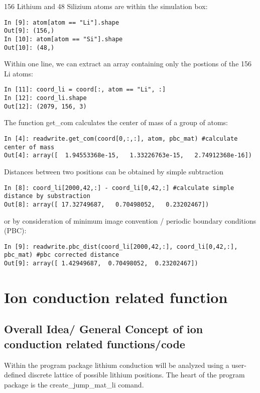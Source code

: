 \documentclass{article}
\begin{document}
\begin{itemize}
156 Lithium and 48 Silizium atoms are within the simulation box:
\begin{verbatim}
In [9]: atom[atom == "Li"].shape
Out[9]: (156,)
In [10]: atom[atom == "Si"].shape
Out[10]: (48,)
\end{verbatim}
%

Within one line, we can extract an array containing only the postions of the 156 Li atoms:
\begin{verbatim}
In [11]: coord_li = coord[:, atom == "Li", :]
In [12]: coord_li.shape
Out[12]: (2079, 156, 3)
\end{verbatim}

The function get\_com calculates the center of mass of a group of atoms:
\begin{verbatim}
In [4]: readwrite.get_com(coord[0,:,:], atom, pbc_mat) #calculate center of mass
Out[4]: array([  1.94553368e-15,   1.33226763e-15,   2.74912368e-16])
\end{verbatim}
%
Distances between two positions can be obtained by simple subtraction
\begin{verbatim}
In [8]: coord_li[2000,42,:] - coord_li[0,42,:] #calculate simple distance by substraction
Out[8]: array([ 17.32749687,   0.70498052,   0.23202467])
\end{verbatim}
%
or by consideration of minimum image convention / periodic boundary conditions (PBC):
\begin{verbatim}
In [9]: readwrite.pbc_dist(coord_li[2000,42,:], coord_li[0,42,:], pbc_mat) #pbc corrected distance
Out[9]: array([ 1.42949687,  0.70498052,  0.23202467])
\end{verbatim}
%











%
%
%
%
%
%
%
%
%
%
%
%
%
%
%
%
%
%
%
%
%

%
%
%
%
%
%
%
%
%
%
%
%
%
%
%
%
%
%
%

%
%
%
%
%
%
%
\end{itemize}
%
%
%
%
%
%
%


 
\section{Ion conduction related function}


\subsection{Overall Idea/ General Concept of ion conduction related functions/code}
Within the program package lithium conduction will be analyzed using a user-defined discrete lattice of possible lithium positions.
The heart of the program package is the create\_jump\_mat\_li comand.
\end{document}
